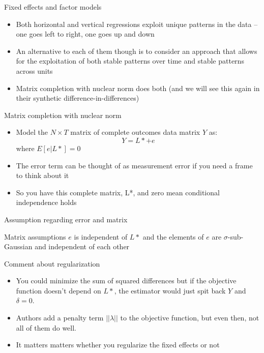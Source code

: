 \documentclass{beamer}
\begin{document}
\begin{frame}{Fixed effects and factor models}

\begin{itemize}
\item Both horizontal and vertical regressions exploit unique patterns in the data -- one goes left to right, one goes up and down
\item An alternative to each of them though is to consider an approach that allows for the exploitation of both stable patterns over time and stable patterns across units
\item Matrix completion with nuclear norm does both (and we will see this again in their synthetic difference-in-differences)
\end{itemize}

\end{frame}

\begin{frame}{Matrix completion with nuclear norm}

\begin{itemize}
\item Model the $N \times T$ matrix of complete outcomes data matrix $Y$ as: $$Y = L* + e$$where $E[e|L*]=0$
\item The error term can be thought of as measurement error if you need a frame to think about it
\item So you have this complete matrix, L*, and zero mean conditional independence holds
\end{itemize}

\end{frame}

\begin{frame}{Assumption regarding error and matrix}

\begin{block}{Matrix assumptions}
$e$ is independent of $L*$ and the elements of $e$ are $\sigma$-sub-Gaussian and independent of each other
\end{block}


\end{frame}

\begin{frame}{Comment about regularization}	
	
\begin{itemize}
\item You could minimize the sum of squared differences but if the objective function doesn't depend on $L*$, the estimator would just spit back $Y$ and $\delta=0$. 
\item Authors add a penalty term $||\lambda||$ to the objective function, but even then, not all of them do well. 
\item It matters matters whether you regularize the fixed effects or not 
\end{itemize}

\end{frame}
\end{document}
